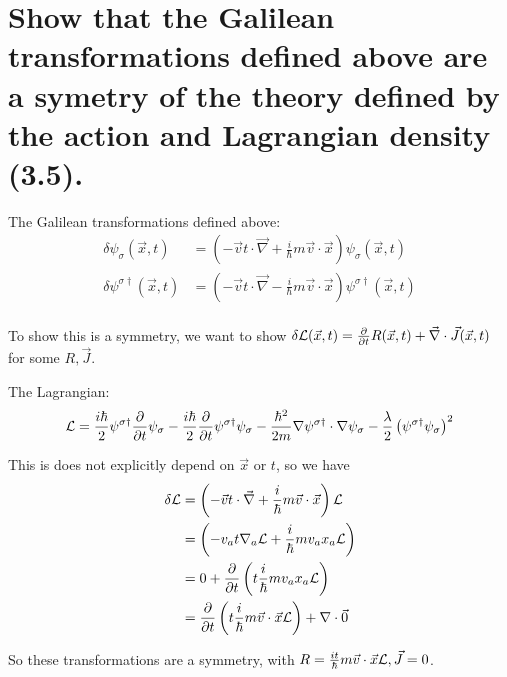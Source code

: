\section{Show that the Galilean transformations defined above are a symetry of the theory defined by the action and Lagrangian density (3.5).}

The Galilean transformations defined above:
\begin{align*}
    \delta\psi_\sigma(\vec{x}, t) &= \left(-\vec{v}t \cdot \vec{\nabla} + \frac{i}{\hbar}m\vec{v}\cdot\vec{x}\right)\psi_\sigma(\vec{x}, t) \\
    \delta\psi^{\sigma\dagger}(\vec{x}, t) &= \left(-\vec{v}t \cdot \vec{\nabla} - \frac{i}{\hbar}m\vec{v}\cdot\vec{x}\right)\psi^{\sigma\dagger}(\vec{x}, t) \\
\end{align*}


To show this is a symmetry, we want to show $\delta\mathcal{L}(\vec{x},t) = \frac{\partial}{\partial t}R(\vec{x},t) + \vec{\nabla}\cdot\vec{J}(\vec{x},t)$ for some $R,\vec{J}$.

The Lagrangian:
\begin{align*}
    \mathcal{L} &= \frac{i\hbar}{2}\psi^{\sigma\dagger} \frac{\partial}{\partial t}\psi_{\sigma} - \frac{i\hbar}{2}\frac{\partial}{\partial t}\psi^{\sigma\dagger} \psi_{\sigma} - \frac{\hbar^2}{2m}\nabla \psi^{\sigma\dagger} \cdot \nabla \psi_{\sigma} - \frac{\lambda}{2}\left(\psi^{\sigma\dagger} \psi_{\sigma}\right)^2 \\
\end{align*}

This is does not explicitly depend on $\vec{x}$ or $t$, so we have
\begin{align*}
    \delta \mathcal{L} &= \left(-\vec{v}t \cdot \vec{\nabla} + \frac{i}{\hbar}m\vec{v}\cdot\vec{x}\right) \mathcal{L} \\
    &= \left(-v_a t \nabla_a \mathcal{L} + \frac{i}{\hbar}m v_a x_a \mathcal{L}\right) \\
    &= 0  + \frac{\partial}{\partial t}\left(t\frac{i}{\hbar}mv_a x_a \mathcal{L}\right) \\
    &= \frac{\partial}{\partial t}\left(t\frac{i}{\hbar}m \vec{v}\cdot\vec{x} \mathcal{L}\right) + \nabla \cdot \vec{0} \\
\end{align*}

So these transformations are a symmetry, with $R=\frac{it}{\hbar}m\vec{v}\cdot \vec{x}\mathcal{L}, \vec{J} = 0$.